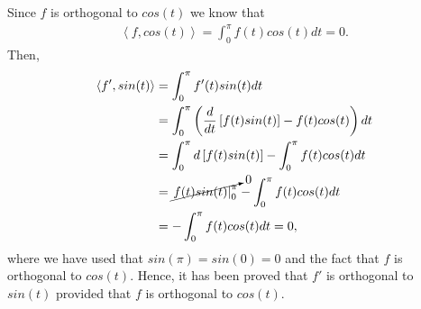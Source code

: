 \begin{questions}

\begin{solution}
Since $f$ is orthogonal to $cos(t)$ we know that
\begin{align*}
\left<f,cos(t)\right>=\int_0^{\pi}f(t)cos(t)dt=0.
\end{align*}
Then,
\begin{align*}
\left<f',sin(t)\right>&=\int_0^{\pi}f'(t)sin(t)dt\\
&=\int_0^{\pi}\left(\frac{d}{dt}\left[f(t)sin(t)\right]-f(t)cos(t)\right)dt\\
&=\int_0^{\pi}d\left[f(t)sin(t)\right]-\int_0^{\pi}f(t)cos(t)dt\\
&=\cancelto{0}{\left.f(t)sin(t)\right|_0^{\pi}}-\int_0^{\pi}f(t)cos(t)dt\\
&=-\int_0^{\pi}f(t)cos(t)dt=0,
\end{align*}
where we have used that $sin(\pi)=sin(0)=0$ and the fact that $f$ is orthogonal to $cos(t)$. Hence, it has been proved that $f'$ is orthogonal to $sin(t)$ provided that $f$ is orthogonal to $cos(t)$.
\end{solution}
\end{questions}
